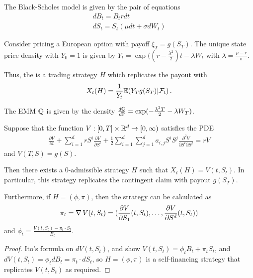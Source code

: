 \begin{defn}
  \label{sec:hedg-cont-claims-2}
  The Black-Scholes model is given by the pair of equations
  \begin{align}
    \label{eq:24}
    dB_{t} = B_{t} r dt \\
    dS_{t} = S_{t}(\mu dt + \sigma dW_{t})
  \end{align}

  Consider pricing a European option with payoff $\xi_{T} = g(S_{T})$.
  The unique state price density with $Y_{0} = 1$ is given by $Y_{t} =
  \exp((r - \frac{\lambda^{2}}{2})t - \lambda W_{t}$ with $\lambda =
  \frac{\mu - r}{\sigma}$.


  Thus, the is a trading strategy $H$ which replicates the payout with
  \begin{align}
    \label{eq:25}
    X_{t}(H) = \frac{1}{Y_{t}} \E{Y_{T} g(S_{T}) | \mathcal{F}_{t}}.
  \end{align}

  The EMM $\Q$ is given by the density $\frac{d\Q}{d\Prob} =
  \exp(-\frac{\lambda^{2} T}{2} - \lambda W_{T})$.
\end{defn}

\begin{thm}
  \label{sec:hedg-cont-claims-3}
  Suppose that the function $V: [0, T] \times \mathbb{R}^{d} \rightarrow [0,
  \infty)$ satisfies the PDE
  \begin{align}
    \label{eq:26}
    \frac{\partial V}{\partial t} + \sum_{i=1}^{d} r S^{i}
    \frac{\partial V}{\partial S^{i}} + \frac{1}{2} \sum_{i=1}^{d}
    \sum_{j=1}^{d} a_{i, j} S^{i} S^{j} \frac{\partial^{2} V}{\partial
      S^{i} \partial S^{j}} = rV
  \end{align} and $V(T, S) = g(S)$.

  Then there exists a $0$-admissible strategy $H$ such that $X_{t}(H)
  = V(t, S_{t})$. In particular, this strategy replicates the
  contingent claim with payout $g(S_{T})$.

  Furthermore, if $H = (\phi, \pi)$, then the strategy can be
  calculated as
  \begin{align}
    \label{eq:27}
    \pi_{t} = \operatorname*{\nabla} V(t, S_{t}) = (\frac{\partial V}{\partial
      S_{1}}(t, S_{t}), \dots, \frac{\partial V}{\partial S^{d}}(t,
    S_{t}))
  \end{align} and $\phi_{t} = \frac{V(t, S_{t}) - \pi_{t} \cdot
    S_{t}}{B_{t}}$.
\end{thm}

\begin{proof}
  Ito's formula on $dV(t, S_{t})$, and show $V(t, S_{t})= \phi_{t}
  B_{t} + \pi_{t} S_{t}$, and $dV(t, S_{t}) = \phi_{t} dB_{t} =
  \pi_{t} \cdot dS_{t}$, so $H = (\phi, \pi)$ is a self-financing
  strategy that replicates $V(t, S_{t})$ as required.
\end{proof}

